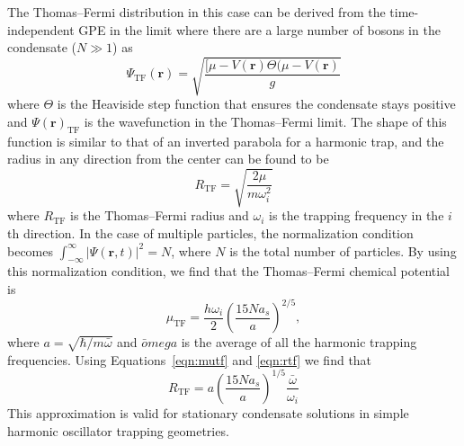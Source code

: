 The Thomas--Fermi distribution in this case can be derived from the time-independent GPE in the limit where there are a large number of bosons in the condensate ($N \gg 1$) as~\cite{ueda2010}
\begin{equation}
\Psi_\text{TF}(\mathbf{r}) = \sqrt{\frac{[\mu-V(\mathbf{r})\Theta(\mu-V(\mathbf{r})}{g}}
\end{equation}
\noindent where $\Theta$ is the Heaviside step function that ensures the condensate stays positive and $\Psi(\mathbf{r})_\text{TF}$ is the wavefunction in the Thomas--Fermi limit.
The shape of this function is similar to that of an inverted parabola for a harmonic trap, and the radius in any direction from the center can be found to be
\begin{equation}
R_\text{TF} = \sqrt{\frac{2\mu}{m\omega_i^2}}
\label{eqn:rtf}
\end{equation}
\noindent where $R_\text{TF}$ is the Thomas--Fermi radius and $\omega_i$ is the trapping frequency in the $i$th direction.
In the case of multiple particles, the normalization condition becomes $\int_{-\infty}^\infty |\Psi(\mathbf{r},t)|^2 = N$, where $N$ is the total number of particles.
By using this normalization condition, we find that the Thomas--Fermi chemical potential is
\begin{equation}
\mu_\text{TF} = \frac{h\omega_i}{2}\left(\frac{15 N a_s}{a} \right)^{2/5},
\label{eqn:mutf}
\end{equation}
\noindent where $a=\sqrt{\hbar/m\bar\omega}$ and $\bar omega$ is the average of all the harmonic trapping frequencies.
Using Equations~\eqref{eqn:mutf} and \eqref{eqn:rtf} we find that
\begin{equation}
R_\text{TF} = a\left(\frac{15 N a_s}{a} \right)^{1/5}\frac{\bar \omega}{\omega_i}
\end{equation}
This approximation is valid for stationary condensate solutions in simple harmonic oscillator trapping geometries.

